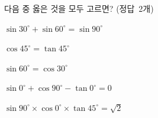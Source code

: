 다음 중 옳은 것을 모두 고르면? \mbox{(정답 2개)}
\begin{choicesii}{\rule[-3ex]{0pt}{8ex}$\sin 30^\circ+\sin 60^\circ=\sin 90^\circ$}{\rule[-3ex]{0pt}{8ex}$\cos 45^\circ=\tan 45^\circ$}{\rule[-3ex]{0pt}{8ex}$\sin 60^\circ=\cos 30^\circ$}{\rule[-3ex]{0pt}{8ex}$\sin 0^\circ+\cos 90^\circ-\tan 0^\circ=0$}{\rule[-3ex]{0pt}{8ex}$\sin 90^\circ\times\cos 0^\circ\times\tan 45^\circ=\sqrt{2}$}\end{choicesii}
